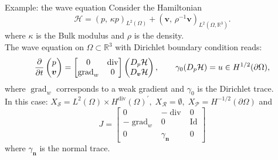 \documentclass[aspectratio=169]{beamer}
\DeclareMathOperator*{\grad}{grad}
\renewcommand{\div}{\operatorname{div}}
\newcommand{\bbR}{\mathbb{R}}
\newcommand{\inpr}[3][]{\ensuremath{( #2, \, #3 )_{#1}}}
\begin{document}
\begin{frame}{Example: the wave equation}
	Consider the Hamiltonian
	\begin{equation*}
		\mathcal{H} = \inpr[L^2(\Omega)]{p}{\kappa p} + \inpr[L^2(\Omega, \bbR^3)]{\bm{v}}{\rho^{-1}\bm{v}}.
	\end{equation*}
	where $\kappa$ is the Bulk modulus and $\rho$ is the density. \\
	\vspace{.5cm}
	The wave equation on $\Omega \subset \bbR^3$ with Dirichlet boundary condition reads:
	\begin{equation*}
		\diffp{}{t}
			\begin{pmatrix}
			 p \\
			\bm{v} \\
		\end{pmatrix} =
		\begin{bmatrix}
			0 & \div \\
			\grad_w & 0
		\end{bmatrix}
		\begin{pmatrix}
			D_p\mathcal{H} \\
			D_{\bm{v}}\mathcal{H}\\
		\end{pmatrix}, \qquad \gamma_0(D_p\mathcal{H}) = u \in H^{1/2}(\partial\Omega),
	\end{equation*}
where $\grad_w$ corresponds to a weak gradient and $\gamma_0$ is the Dirichlet trace.\\
In this case: $X_{\mathcal{S}}= L^2(\Omega) \times H^{\div}(\Omega)^{'}, \; X_{\mathcal{R}} = \emptyset, \; X_{\mathcal{P}}= H^{-1/2}(\partial\Omega)$ and
\begin{equation*}
		J = \begin{bmatrix}
			0 & -\div & 0 \\
			-\grad_w & 0 & \mathrm{Id} \\
			0 & \gamma_{\bm{n}} & 0 
		\end{bmatrix}
	\end{equation*}
where $\gamma_{\bm{n}}$ is the normal trace.

\end{frame}
\end{document}
